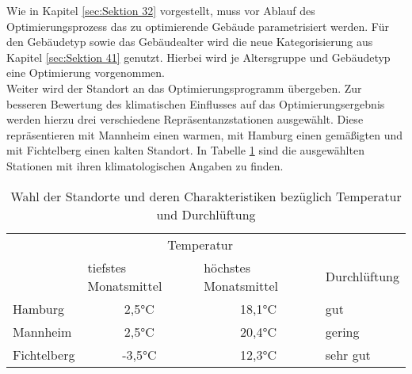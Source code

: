 Wie in Kapitel \ref{sec:Sektion 32} vorgestellt, muss vor Ablauf des Optimierungsprozess das zu optimierende Gebäude parametrisiert werden.
Für den Gebäudetyp sowie das Gebäudealter wird die neue Kategorisierung aus Kapitel \ref{sec:Sektion 41} genutzt.
Hierbei wird je Altersgruppe und Gebäudetyp eine Optimierung vorgenommen.\\
Weiter wird der Standort an das Optimierungsprogramm übergeben.
Zur besseren Bewertung des klimatischen Einflusses auf das Optimierungsergebnis werden hierzu drei verschiedene Repräsentanzstationen ausgewählt.
Diese repräsentieren mit Mannheim einen warmen, mit Hamburg einen gemäßigten und mit Fichtelberg einen kalten Standort.
In Tabelle \ref{tab: Tabelle521} sind die ausgewählten Stationen mit ihren klimatologischen Angaben zu finden.
\begin{table}[H]\centering
\begin{tabular}{|l|c|c|l|}
\hline
\rowcolor[HTML]{C0C0C0} 
\cellcolor[HTML]{C0C0C0} & \multicolumn{2}{c|}{\cellcolor[HTML]{C0C0C0}Temperatur} & \cellcolor[HTML]{C0C0C0} \\ \cline{2-3}
\rowcolor[HTML]{C0C0C0} 
\multirow{-2}{*}{\cellcolor[HTML]{C0C0C0}Repräsentanzstation} & \multicolumn{1}{l|}{\cellcolor[HTML]{C0C0C0}tiefstes Monatsmittel} & \multicolumn{1}{l|}{\cellcolor[HTML]{C0C0C0}höchstes Monatsmittel} & \multirow{-2}{*}{\cellcolor[HTML]{C0C0C0}Durchlüftung} \\ \hline
Hamburg & 2,5°C & 18,1°C & gut \\ \hline
\rowcolor[HTML]{EFEFEF} 
Mannheim & 2,5°C & 20,4°C & gering \\ \hline
Fichtelberg & -3,5°C & 12,3°C & sehr gut \\ \hline
\end{tabular}
\caption{Wahl der Standorte und deren Charakteristiken bezüglich Temperatur und Durchlüftung \cite{try}}
\label{tab: Tabelle521}
\end{table}

